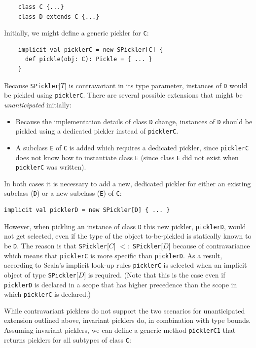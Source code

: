 \documentclass[preprint,10pt]{sigplanconf}
\theoremstyle{definition}
\theoremstyle{definition}
\newcommand{\term}[1]{\mbox{\texttt{#1}}}
\begin{document}
\begin{lstlisting}
    class C {...}
    class D extends C {...}
\end{lstlisting}

Initially, we might define a generic pickler for \term{C}:

\begin{lstlisting}
    implicit val picklerC = new SPickler[C] {
      def pickle(obj: C): Pickle = { ... }
    }
\end{lstlisting}

Because \term{SPickler}[$T$] is contravariant in its type parameter, instances
of \term{D} would be pickled using \term{picklerC}. There are several possible
extensions that might be {\em unanticipated} initially:

\begin{itemize}
\item Because the implementation details of class \term{D} change, instances
of \term{D} should be pickled using a dedicated pickler instead of
\term{picklerC}.

\item A subclass \term{E} of \term{C} is added which requires a dedicated
pickler, since \term{picklerC} does not know how to instantiate class \term{E}
(since class \term{E} did not exist when \term{picklerC} was written).
\end{itemize}

In both cases it is necessary to add a new, dedicated pickler for either an
existing subclass (\term{D}) or a new subclass (\term{E}) of \term{C}:

\begin{lstlisting}
implicit val picklerD = new SPickler[D] { ... }
\end{lstlisting}

However, when pickling an instance of class \term{D} this new pickler,
\term{picklerD}, would not get selected, even if the type of the object to-be-pickled
is statically known to be \term{D}. The reason is that
\term{SPickler}[$C$] $<:$ \term{SPickler}[$D$] because of contravariance which
means that \term{picklerC} is more specific than \term{picklerD}. As a result,
according to Scala's implicit look-up rules \term{picklerC} is selected when
an implicit object of type \term{SPickler}[$D$] is required. (Note that this
is the case even if \term{picklerD} is declared in a scope that has higher
precedence than the scope in which \term{picklerC} is declared.)

While contravariant picklers do not support the two scenarios for
unanticipated extension outlined above, invariant picklers do, in combination
with type bounds. Assuming invariant picklers, we can define a generic method
\term{picklerC1} that returns picklers for all subtypes of class \term{C}:
\end{document}
